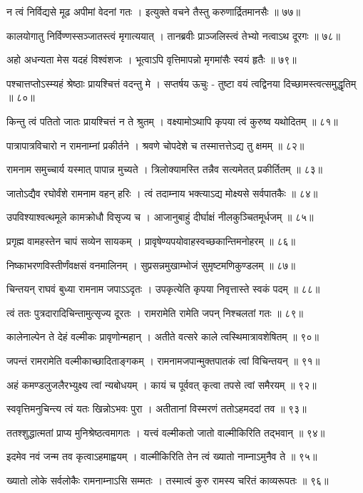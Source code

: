 न त्वं निर्विद्यसे मूढ अपीमां वेदनां गतः ।
इत्युक्ते वचने तैस्तु करुणार्द्रितमानसैः ॥ ७७॥

कालयोगातु निर्विण्णस्सञ्जातस्त्वं मृगात्ययात् ।
तानब्रवीः प्राञ्जलिस्त्वं तेभ्यो नत्वाऽथ दूरगः ॥ ७८॥

अहो अधन्यता मेस यदहं विश्वंशजः ।
भूत्वाऽपि वृत्तिमापन्नो मृगमांसैः स्वयं हृतैः ॥ ७९॥

पश्चात्तप्तोऽस्म्यहं श्रेष्ठाः प्रायश्चित्तं वदन्तु मे ।
सप्तर्षय ऊचुः -
तुष्टा वयं त्वद्विनया दिच्छामस्त्वत्समुद्धृतिम् ॥ ८०॥

किन्तु त्वं पतितो जातः प्रायश्चित्तं न ते श्रुतम् ।
वक्ष्यामोऽथापि कृपया त्वं कुरुष्व यथोदितम् ॥ ८१॥

पात्रापात्रविचारो न रामनाम्नां प्रकीर्तने ।
श्रवणे चोपदेशे च तस्मात्तत्तेऽद्य तु क्षमम् ॥ ८२॥

रामनाम समुच्चार्य यस्मात् पापान्न मुच्यते ।
त्रिलोक्यामस्ति तन्नैव सत्यमेतत् प्रकीर्तितम् ॥ ८३॥

जातोऽद्यैव रघोर्वंशे रामनाम वहन् हरिः ।
त्वं तदाम्नाय भक्त्याऽद्य मोक्ष्यसे सर्वपातकैः ॥ ८४॥

उपविश्याश्वत्थमूले कामक्रोधौ विसृज्य च ।
आजानुबाहुं दीर्घाक्षं नीलकुञ्चितमूर्धजम् ॥ ८५॥

प्रगृह्म वामहस्तेन चापं सव्येन सायकम् ।
प्रावृषेण्यपयोवाहस्वच्छकान्तिमनोहरम् ॥ ८६॥

निष्काभरणविस्तीर्णंवक्षसं वनमालिनम् ।
सुप्रसन्नमुखाम्भोजं सुमृष्टमणिकुण्डलम् ॥ ८७॥

चिन्तयन् राघवं बुध्या रामनाम जपाऽऽदृतः ।
उपकृत्येति कृपया निवृत्तास्ते स्वकं पदम् ॥ ८८॥

त्वं ततः पुत्रदारादिचिन्तामुत्सृज्य दूरतः ।
रामरामेति रामेति जपन् निश्चलतां गतः ॥ ८९॥

कालेनाल्पेन ते देहं वल्मीकः प्रावृणोन्महान् ।
अतीते वत्सरे काले त्वस्थिमात्रावशेषितम् ॥ ९०॥

जपन्तं रामरामेति वल्मीकाच्छादिताङ्गकम् ।
रामनामजपान्मुक्तपातकं त्वां विचिन्तयन् ॥ ९१॥

अहं कमण्डलुजलैरभ्युक्ष्य त्वां न्यबोधयम् ।
कायं च पूर्ववत् कृत्वा तपसे त्वां समैरयम् ॥ ९२॥

स्ववृत्तिमनुचिन्त्य त्वं यतः खिन्नोऽभवः पुरा ।
अतीतानां विस्मरणं ततोऽहमददां तव ॥ ९३॥

ततश्शुद्धात्मतां प्राप्य मुनिश्रेष्ठत्वमागतः ।
यत्त्वं वल्मीकतो जातो वाल्मीकिरिति तद्भवान् ॥ ९४॥

इदमेव नवं जन्म तव कृत्वाऽहमाह्वयम् ।
वाल्मीकिरिति तेन त्वं ख्यातो नाम्नाऽमुनैव ते ॥ ९५॥

ख्यातो लोके सर्वलोकैः रामनाम्नाऽसि सम्मतः ।
तस्मात्वं कुरु रामस्य चरितं काव्यरूपतः ॥ ९६॥

